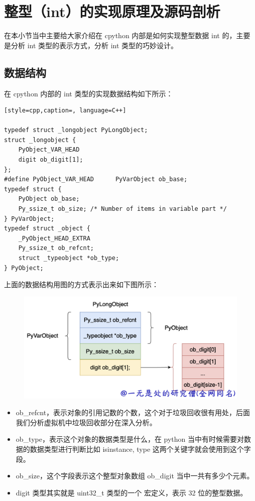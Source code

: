 \section{整型（int）的实现原理及源码剖析}
在本小节当中主要给大家介绍在 cpython 内部是如何实现整型数据 int 的，主要是分析 int 类型的表示方式，分析 int 类型的巧妙设计。
\subsection{数据结构}
在 cpython 内部的 int 类型的实现数据结构如下所示：
\begin{lstlisting}[style=cpp,caption=, language=C++]

typedef struct _longobject PyLongObject;
struct _longobject {
	PyObject_VAR_HEAD
	digit ob_digit[1];
};
#define PyObject_VAR_HEAD      PyVarObject ob_base;
typedef struct {
    PyObject ob_base;
    Py_ssize_t ob_size; /* Number of items in variable part */
} PyVarObject;
typedef struct _object {
    _PyObject_HEAD_EXTRA
    Py_ssize_t ob_refcnt;
    struct _typeobject *ob_type;
} PyObject;
\end{lstlisting}
上面的数据结构用图的方式表示出来如下图所示：

    \begin{figure}[h]
        \centering
            \includegraphics[scale=.2]{images/22-int.png}
            \caption{ }
        \label{fig:my_label}
    \end{figure}
    
\begin{itemize}
\item ob\_refcnt，表示对象的引用记数的个数，这个对于垃圾回收很有用处，后面我们分析虚拟机中垃圾回收部分在深入分析。 
\item ob\_type，表示这个对象的数据类型是什么，在 python 当中有时候需要对数据的数据类型进行判断比如 isinstance, type 这两个关键字就会使用到这个字段。 
\item ob\_size，这个字段表示这个整型对象数组 ob\_digit 当中一共有多少个元素。 
\item digit 类型其实就是 uint32\_t 类型的一个 宏定义，表示 32 位的整型数据。 
\end{itemize}
